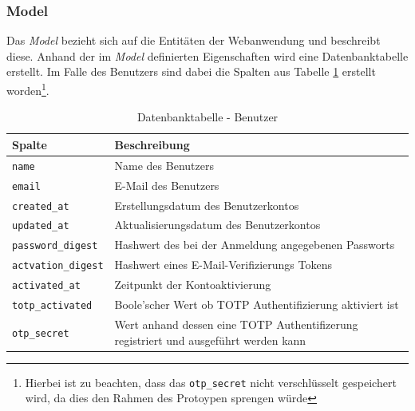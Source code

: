 \documentclass[11pt,a4paper,ngerman]{scrreprt}
\begin{document}
\subsubsection{Model}
Das \textit{Model} bezieht sich auf die Entitäten der Webanwendung und beschreibt diese. Anhand der im \textit{Model} definierten Eigenschaften wird eine Datenbanktabelle erstellt. Im Falle des Benutzers sind dabei die Spalten aus Tabelle \ref{table:db-user} erstellt worden\footnote{Hierbei ist zu beachten, dass das \texttt{otp\_secret} nicht verschlüsselt gespeichert wird, da dies den Rahmen des Protoypen sprengen würde}.
\begin{table}[htbp]
    \begin{tabularx}{\textwidth}{ lX }
        \toprule
        Spalte & Beschreibung \\ 
        \midrule
        \texttt{name} & Name des Benutzers \\
        \texttt{email} & E-Mail des Benutzers \\
        \texttt{created\_at} & Erstellungsdatum des Benutzerkontos \\
        \texttt{updated\_at} & Aktualisierungsdatum des Benutzerkontos \\
        \texttt{password\_digest} & Hashwert des bei der Anmeldung angegebenen Passworts \\
        \texttt{actvation\_digest} & Hashwert eines E-Mail-Verifizierungs Tokens \\
        \texttt{activated\_at} & Zeitpunkt der Kontoaktivierung \\
        \texttt{totp\_activated} & Boole'scher Wert ob TOTP Authentifizierung aktiviert ist \\
        \texttt{otp\_secret} & Wert anhand dessen eine TOTP Authentifizerung registriert und ausgeführt werden kann \\
        \bottomrule
    \end{tabularx}
    \caption{Datenbanktabelle - Benutzer}
    \label{table:db-user}
\end{table}
\end{document}

